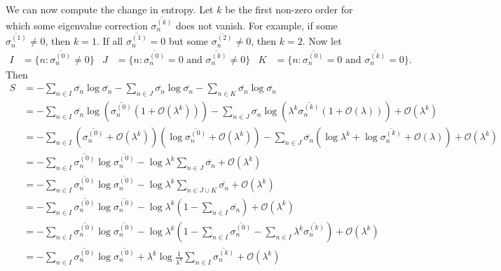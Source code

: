 \documentclass[11pt]{article}
\newcommand{\Od}[1]{\mathcal{O}{\left(#1\right)}}
\theoremstyle{theorem}
\theoremstyle{remark}
\theoremstyle{step}
\theoremstyle{gap}
\begin{document}
We can now compute the change in entropy.
Let \(k\) be the first non-zero order for which some eigenvalue correction \(\overline{\sigma_n^{(k)}}\) does not vanish. For example, if some \(\overline{\sigma_n^{(1)}} \neq 0\), then \(k = 1\). If all \(\overline{\sigma_n^{(1)}} = 0\) but some \(\overline{\sigma_n^{(2)}} \neq 0\), then \(k = 2\). Now let
\begin{align*}
I &= \{n : \overline{\sigma_n^{(0)}} \neq 0\} &
J &= \{n : \overline{\sigma_n^{(0)}} = 0 \text{ and } \overline{\sigma_n^{(k)}} \neq 0\} &
K &= \{n : \overline{\sigma_n^{(0)}} = 0 \text{ and } \overline{\sigma_n^{(k)}} = 0\}.
\end{align*}
Then
\begin{align*}
S &= -\sum_{n \in I} \overline{\sigma_n} \log \overline{\sigma_n}-\sum_{n \in J} \overline{\sigma_n} \log \overline{\sigma_n} -\sum_{n \in K} \overline{\sigma_n} \log \overline{\sigma_n} \\
&= - \sum_{n \in I} \overline{\sigma_n} \log \left(\overline{\sigma_n^{(0)}} \left(1 + \Od{\lambda^{k}}\right)\right)  - \sum_{n \in J} \overline{\sigma_n} \log\left(\lambda^{k}\overline{\sigma_n^{(k)}}\left(1 + \Od{\lambda}\right)\right) + \Od{\lambda^k} \\
&= - \sum_{n \in I} \left(\overline{\sigma_n^{(0)}} + \Od{\lambda^{k}}\right) \left(\log \overline{\sigma_n^{(0)}}+\Od{\lambda^{k}}\right) - \sum_{n \in J} \overline{\sigma_n} \left(\log\lambda^{k}+\log\overline{\sigma_n^{(k)}}+ \Od{\lambda}\right) + \Od{\lambda^k}\\
&= - \sum_{n \in I} \overline{\sigma_n^{(0)}} \log \overline{\sigma_n^{(0)}} -\log\lambda^{k} \sum_{n \in J} \overline{\sigma_n} + \Od{\lambda^k} \\
&= - \sum_{n \in I} \overline{\sigma_n^{(0)}} \log \overline{\sigma_n^{(0)}} -\log\lambda^{k} \sum_{n \in J\cup K} \overline{\sigma_n} + \Od{\lambda^k} \\
&= - \sum_{n \in I} \overline{\sigma_n^{(0)}} \log \overline{\sigma_n^{(0)}} -\log\lambda^{k} \left(1 - \sum_{n \in I} \overline{\sigma_n}\right) + \Od{\lambda^k} \\
&= - \sum_{n \in I} \overline{\sigma_n^{(0)}} \log \overline{\sigma_n^{(0)}} -\log\lambda^{k} \left(1 - \sum_{n \in I} \overline{\sigma_n^{(0)}} - \sum_{n \in I} \lambda^k \overline{\sigma_n^{(k)}}\right) + \Od{\lambda^k} \\
&= - \sum_{n \in I} \overline{\sigma_n^{(0)}} \log \overline{\sigma_n^{(0)}} +\lambda^k\log\frac{1}{\lambda^{k}} \sum_{n \in I} \overline{\sigma_n^{(k)}} + \Od{\lambda^k}
\end{align*}
\end{document}
